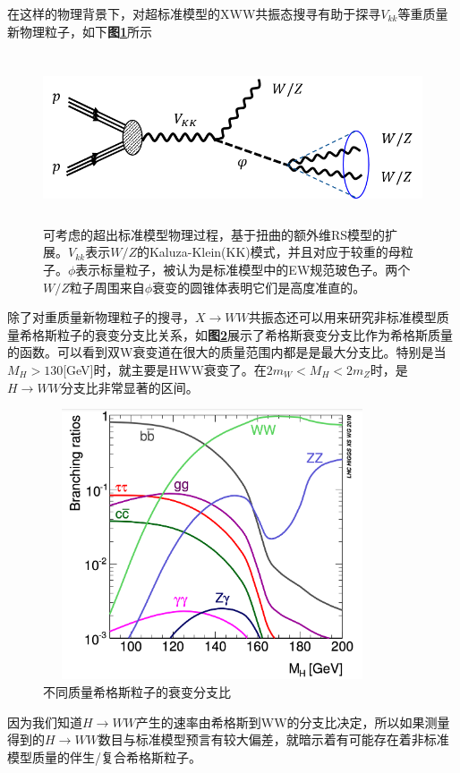 在这样的物理背景下，对超标准模型的XWW共振态搜寻有助于探寻$V_{kk}$等重质量新物理粒子，如下\textbf{图\ref{fig:2.7}}所示
\begin{figure}[H]
 \centering
 \includegraphics[height=5cm, width=16cm]{pictures/Vkk.png}
  \caption{可考虑的超出标准模型物理过程，基于扭曲的额外维RS模型的扩展。$V_{kk}$表示$W/Z$的Kaluza-Klein(KK)模式，并且对应于较重的母粒子。$\phi$表示标量粒子，被认为是标准模型中的EW规范玻色子。两个$W/Z$粒子周围来自$\phi$衰变的圆锥体表明它们是高度准直的。\cite{Detecting_a_Boosted_Diboson_Resonance}}
 \label{fig:2.7}
\end{figure}

除了对重质量新物理粒子的搜寻，$X\to WW$共振态还可以用来研究非标准模型质量希格斯粒子的衰变分支比关系，如\textbf{图\ref{fig:2.8}}展示了希格斯衰变分支比作为希格斯质量的函数。可以看到双W衰变道在很大的质量范围内都是是最大分支比。特别是当$M_H>130$[GeV]时，就主要是HWW衰变了。在$2m_W<M_H<2m_Z$时，是$H\to WW$分支比非常显著的区间。
\begin{figure}[H]
 \centering
 \includegraphics[height=8cm, width=10cm]{pictures/XS-MH.png}
  \caption{不同质量希格斯粒子的衰变分支比\cite{john-alison}}
 \label{fig:2.8}
\end{figure}
因为我们知道$H\to WW$产⽣的速率由希格斯到WW的分⽀⽐决定，所以如果测量得到的$H\to WW$数目与标准模型预言有较大偏差，就暗示着有可能存在着非标准模型质量的伴生/复合希格斯粒子。

